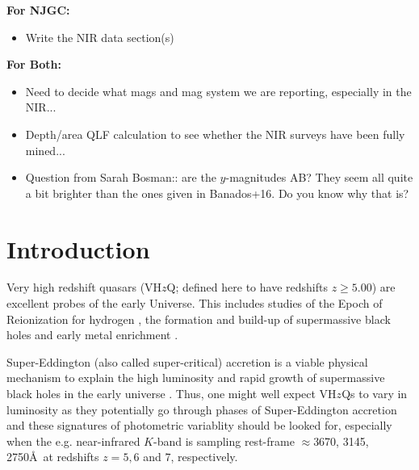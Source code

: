 \documentclass[usenatbib]{mnras}
\begin{document}
\noindent
{\bf For NJGC: }
\begin{itemize}
\item Write the NIR data section(s) 
\end{itemize}

\noindent
{\bf For Both: }
\begin{itemize}
\item Need to decide what mags and mag system we are reporting, especially in the 
NIR...
\item Depth/area QLF calculation to see whether the NIR surveys have been fully mined...
\item Question from Sarah Bosman:: are the $y$-magnitudes AB? They seem all quite a bit brighter than the ones given in Banados+16. Do you know why that is?
\end{itemize}
\fi


\section{Introduction}
Very high redshift quasars (VH$z$Q; defined here to have redshifts
$z\geq5.00$) are excellent probes of the early Universe. This includes
studies of the Epoch of Reionization for hydrogen \citep[see e.g.][for
reviews]{Fan2006review, Mortlock2016}, the formation and build-up of
supermassive black holes \citep[e.g., ][]{Rees1984, WyitheLoeb2003,
Volonteri2010, Agarwal2016, Valiante2018, Latif2018} and early metal
enrichment \citep[see e.g., ][]{Simcoe2012, Chen2017, Bosman2017}.

Super-Eddington (also called super-critical) accretion is a viable
physical mechanism to explain the high luminosity and rapid growth of
supermassive black holes in the early universe
\citep[e.g.,][]{AlexanderNatarajan2014, MadauHaardtDotti2014,
Volonteri2015, Pezzulli2016, Lupi2016, Pezzulli2017, Takeo2018}. Thus,
one might well expect VH$z$Qs to vary in luminosity as they
potentially go through phases of Super-Eddington accretion and these
signatures of photometric variablity should be looked for, especially
when the e.g. near-infrared $K$-band is sampling rest-frame
$\approx$3670, 3145, 2750\AA\ at redshifts $z=5, 6$ and 7,
respectively.
\end{document}
